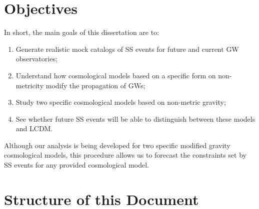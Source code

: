 \section{Objectives}
\label{sec:objectives}

In short, the main goals of this dissertation are to:
\begin{enumerate}[font=\bfseries]
    \item Generate realistic mock catalogs of \gls{SS} events for future and current \gls{GW} observatories;
    \item Understand how cosmological models based on a specific form on non-metricity modify the propagation of \glspl{GW};
    \item Study two specific cosmological models based on non-metric gravity;
    \item See whether future \gls{SS} events will be able to distinguish between these models and \gls{LCDM}.
\end{enumerate}
Although our analysis is being developed for two specific modified gravity cosmological models, this procedure allows us to forecast the constraints set by \gls{SS} events for any provided cosmological model.


\section{Structure of this Document}
\label{sec:structure-of-this-document}

